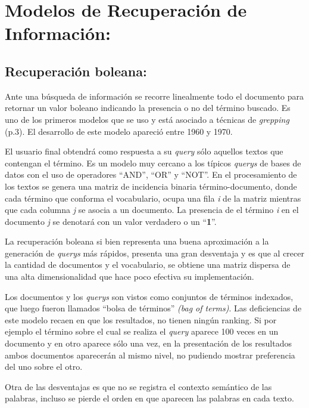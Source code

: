 \documentclass[
  10,
  spanish,
  openany]{book}
\begin{document}
\hypertarget{modelos-de-recuperaciuxf3n-de-informaciuxf3n}{%
\section{Modelos de Recuperación de Información:}\label{modelos-de-recuperaciuxf3n-de-informaciuxf3n}}

\hypertarget{recuperaciuxf3n-boleana}{%
\subsection{Recuperación boleana:}\label{recuperaciuxf3n-boleana}}

Ante una búsqueda de información se recorre linealmente todo el documento para retornar un valor boleano indicando la presencia o no del término buscado. Es uno de los primeros modelos que se uso y está asociado a técnicas de \emph{grepping} \citep{manning2008} (p.3). El desarrollo de este modelo apareció entre 1960 y 1970.

El usuario final obtendrá como respuesta a su \emph{query} sólo aquellos textos que contengan el término. Es un modelo muy cercano a los típicos \emph{querys} de bases de datos con el uso de operadores ``AND'', ``OR'' y ``NOT''. En el procesamiento de los textos se genera una matriz de incidencia binaria término-documento, donde cada término que conforma el vocabulario, ocupa una fila \emph{i} de la matriz mientras que cada columna \emph{j} se asocia a un documento. La presencia de el término \emph{i} en el documento \emph{j} se denotará con un valor verdadero o un ``\textbf{1}''.

La recuperación boleana si bien representa una buena aproximación a la generación de \emph{querys} más rápidos, presenta una gran desventaja y es que al crecer la cantidad de documentos y el vocabulario, se obtiene una matriz dispersa de una alta dimensionalidad que hace poco efectiva su implementación.

Los documentos y los \emph{querys} son vistos como conjuntos de términos indexados, que luego fueron llamados ``bolsa de términos'' \emph{(bag of terms)}. Las deficiencias de este modelo recaen en que los resultados, no tienen ningún ranking. Si por ejemplo el término sobre el cual se realiza el \emph{query} aparece 100 veces en un documento y en otro aparece sólo una vez, en la presentación de los resultados ambos documentos aparecerán al mismo nivel, no pudiendo mostrar preferencia del uno sobre el otro.

Otra de las desventajas es que no se registra el contexto semántico de las palabras, incluso se pierde el orden en que aparecen las palabras en cada texto.
\end{document}
